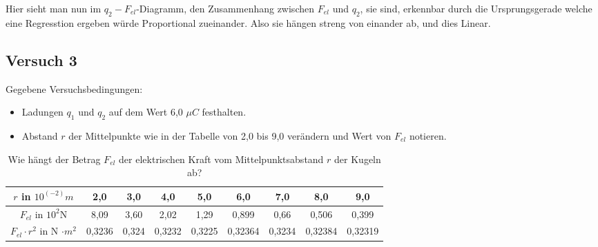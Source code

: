 \documentclass[a4paper]{article}
\begin{document}

Hier sieht man nun im $q_2-F_{el}$-Diagramm, den Zusammenhang zwischen $F_{el}$
und $q_2$, sie sind, erkennbar durch die Ursprungsgerade welche eine
Regresstion ergeben w\"urde Proportional zueinander. Also sie h\"angen streng
von einander ab, und dies Linear.


\subsection{Versuch 3}

Gegebene Versuchsbedingungen:
\begin{itemize}
    \item Ladungen $q_1$ und $q_2$ auf dem Wert 6,0 $ \mu C$ festhalten.
    \item Abstand $r$ der Mittelpunkte wie in der Tabelle von 2,0 bis 9,0
        ver\"andern und Wert von $F_{el}$ notieren.
\end{itemize}


\begin{table}[htpb]
    \centering
    \label{tab:vers2}
    \begin{tabular}{c|cccccccc}
        \toprule
        $r$ in $10^{(-2)}m$ & 2,0 & 3,0 & 4,0 & 5,0 & 6,0 & 7,0 & 8,0 & 9,0\\ 
        \midrule
        $F_{el}$ in $10^{2}$N & 8,09 & 3,60 & 2,02 & 1,29 & 0,899 & 0,66 & 0,506 & 0,399 \\
        \midrule
        $F_{el}\cdot r^2$ in N $\cdot m^2$ & 0,3236 & 0,324 & 0,3232 & 0,3225 & 0,32364 & 0,3234 & 0,32384 & 0,32319\\
        \bottomrule
    \end{tabular}
    \caption{Wie h\"angt der Betrag $F_{el}$ der elektrischen Kraft vom
    Mittelpunktsabstand $r$ der Kugeln ab?}
\end{table}
\end{document}
